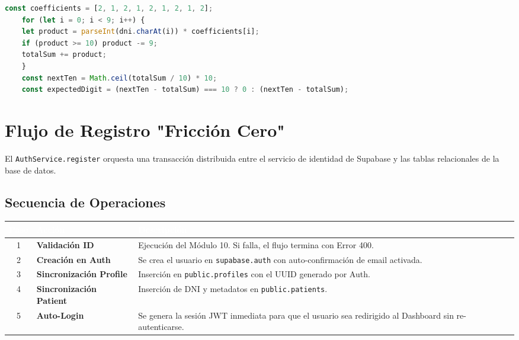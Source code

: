 \documentclass[a4paper,12pt]{article}
\renewcommand{\arraystretch}{1.1}
\begin{document}
    \begin{lstlisting}[language=TypeScript, caption={Extracto de implementación del validador}, basicstyle=\small\ttfamily]
    const coefficients = [2, 1, 2, 1, 2, 1, 2, 1, 2];
    for (let i = 0; i < 9; i++) {
    let product = parseInt(dni.charAt(i)) * coefficients[i];
    if (product >= 10) product -= 9;
    totalSum += product;
    }
    const nextTen = Math.ceil(totalSum / 10) * 10;
    const expectedDigit = (nextTen - totalSum) === 10 ? 0 : (nextTen - totalSum);
    \end{lstlisting}

    \section{Flujo de Registro "Fricción Cero"}

    El \texttt{AuthService.register} orquesta una transacción distribuida entre el servicio de identidad de Supabase y las tablas relacionales de la base de datos.

    \subsection{Secuencia de Operaciones}

    \begin{table}[H]
    \centering\small\renewcommand{\arraystretch}{1.5}
    \begin{tabular}{|c|l|p{7cm}|}
    \hline
    \rowcolor{SKTPrimary}
    \textcolor{white}{\textbf{Paso}} & \textcolor{white}{\textbf{Acción}} & \textcolor{white}{\textbf{Descripción}} \\
    \hline
    1 & \textbf{Validación ID} & Ejecución del Módulo 10. Si falla, el flujo termina con Error 400. \\
    \hline
    2 & \textbf{Creación en Auth} & Se crea el usuario en \texttt{supabase.auth} con auto-confirmación de email activada. \\
    \hline
    3 & \textbf{Sincronización Profile} & Inserción en \texttt{public.profiles} con el UUID generado por Auth. \\
    \hline
    4 & \textbf{Sincronización Patient} & Inserción de DNI y metadatos en \texttt{public.patients}. \\
    \hline
    5 & \textbf{Auto-Login} & Se genera la sesión JWT inmediata para que el usuario sea redirigido al Dashboard sin re-autenticarse. \\
    \hline
    \end{tabular}
    \end{table}
\end{document}
